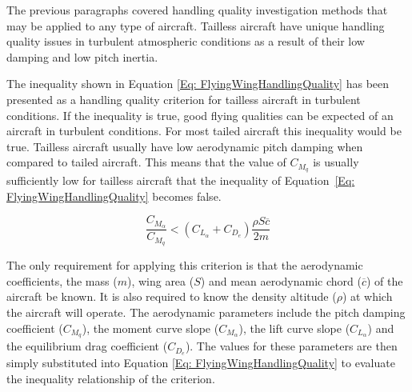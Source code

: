 \documentclass{report}
\begin{document}

The previous paragraphs covered handling quality investigation methods that may be applied to any type of aircraft.  Tailless aircraft have unique handling quality issues in turbulent atmospheric conditions as a result of their low damping and low pitch inertia.  

The inequality shown in Equation \ref{Eq: FlyingWingHandlingQuality} \citep{NewFlyQualitiesFlyingWing} has been presented as a handling quality criterion for tailless aircraft in turbulent conditions.  If the inequality is true, good flying qualities can be expected of an aircraft in turbulent conditions.  For most tailed aircraft this inequality would be true.  Tailless aircraft usually have low aerodynamic pitch damping when compared to tailed aircraft.  This means that the value of $C_{M_q}$ is usually sufficiently low for tailless aircraft that the inequality of \mbox{Equation \ref{Eq: FlyingWingHandlingQuality}} becomes false.  

\begin{equation}\label{Eq: FlyingWingHandlingQuality}
	\frac{C_{M_{\alpha}}}{C_{M_q}} < (C_{L_{\alpha}} + C_{D_e})\frac{\rho S \overline{c}}{2 m}
\end{equation}


The only requirement for applying this criterion is that the aerodynamic coefficients, the mass ($m$), wing area ($S$) and mean aerodynamic chord ($\overline{c}$) of the aircraft be known.  It is also required to know the density altitude ($\rho$) at which the aircraft will operate.  The aerodynamic parameters include the pitch damping coefficient ($C_{M_q}$), the moment curve slope ($C_{M_{\alpha}}$), the lift curve slope ($C_{L_{\alpha}}$) and the equilibrium drag coefficient ($C_{D_e}$).  The values for these parameters are then simply substituted into Equation \ref{Eq: FlyingWingHandlingQuality} to evaluate the inequality relationship of the criterion.
\end{document}
